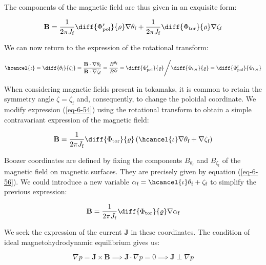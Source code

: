 The components of the magnetic field are thus given in an exquisite form:

\begin{equation}
    \label{eq-6-54}
    \mathbf{B}=\frac{1}{2\pi J_\text{f}}\diff{\Phi_\text{pol}^\text{r}}{\varrho}\nabla\theta_\text{f}+\frac{1}{2\pi J_\text{f}}\diff{\Phi_\text{tor}}{\varrho}\nabla\zeta_\text{f}
\end{equation}

We can now return to the expression of the rotational transform:

\begin{equation}
    \hcancel{\iota}=\diff{\theta_\text{f}}{\zeta_\text{f}}=\frac{\mathbf{B}\cdot\nabla\theta_\text{f}}{\mathbf{B}\cdot\nabla\zeta_\text{f}}=\frac{B^{\theta_\text{f}}}{B^{\zeta_\text{f}}}=\diff{\Phi_\text{pol}^\text{r}}{\varrho}\Bigg/\diff{\Phi_\text{tor}}{\varrho}=\diff{\Phi_\text{pol}^\text{r}}{\Phi_\text{tor}}
\end{equation}

When considering magnetic fields present in tokamaks, it is common to retain the symmetry angle $\zeta=\zeta_\text{f}$ and, consequently, to change the poloidal coordinate. We modify expression (\ref{eq-6-54}) using the rotational transform to obtain a simple contravariant expression of the magnetic field:

\begin{equation}
    \label{eq-6-56}
    \mathbf{B}=\frac{1}{2\pi J_\text{f}}\diff{\Phi_\text{tor}}{\varrho}\left(\hcancel{\iota}\nabla\theta_\text{f}+\nabla\zeta_\text{f}\right)
\end{equation}

Boozer coordinates are defined by fixing the components $B_{\theta_\text{f}}$ and $B_{\zeta_\text{f}}$ of the magnetic field on magnetic surfaces. They are precisely given by equation (\ref{eq-6-56}). We could introduce a new variable $\alpha_\text{f}=\hcancel{\iota}\theta_\text{f}+\zeta_\text{f}$ to simplify the previous expression:

\begin{equation}
    \mathbf{B}=\frac{1}{2\pi J_\text{f}}\diff{\Phi_\text{tor}}{\varrho}\nabla\alpha_\text{f}
\end{equation}

We seek the expression of the current $\mathbf{J}$ in these coordinates. The condition of ideal magnetohydrodynamic equilibrium gives us:

\begin{equation}
    \nabla p=\mathbf{J}\times\mathbf{B}\implies\mathbf{J}\cdot\nabla p=0\implies\mathbf{J}\perp\nabla p
\end{equation}


